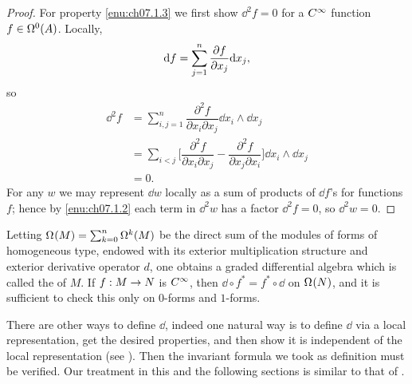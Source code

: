 \documentclass[../main]{subfiles}
\begin{document}
\begin{proof}
\par For property \ref{enu:ch07.1.3} we first show $\dd^2 f = 0$ for a $\CInfty$ function $f \in \formbundle{A}{0}$. Locally, \[\dd f = \sum_{j = 1}^n \pdv{f}{x_j} \dd x_j,\]so 
\begin{align*}
    \dd^2 f &= \sum_{i, j = 1}^n \dfrac{\partial^2 f}{\partial x_i \partial x_j} \dd x_i \wedge \dd x_j \\&= \sum_{i < j} \bigg[\dfrac{\partial^2 f}{\partial x_i \partial x_j} - \dfrac{\partial^2 f}{\partial x_j \partial x_i}\bigg] \dd x_i \wedge \dd x_j\\ &= 0.
\end{align*}
For any $w$ we may represent $\dd w$ locally as a sum of products of $\dd f$'s for functions $f$; hence by \ref{enu:ch07.1.2} each term in $\dd^2 w$ has a factor $\dd^2 f = 0$, so $\dd^2 w = 0$.
\end{proof}



Letting $\formbundle{M}{} = \sum_{k = 0}^n \formbundle{M}{k}$ be the direct sum of the modules of forms of homogeneous type, endowed with its exterior multiplication structure and exterior derivative operator $d$, one obtains a graded differential algebra which is called the  of $M$. If $f : M \functionMaps N$ is $\CInfty$, then $\dd \circ f^\ast = f^\ast \circ \dd$ on $\formbundle{N}{}$, and it is sufficient to check this only on $0$-forms and $1$-forms.

There are other ways to define $\dd$, indeed one natural way is to define $\dd$ via a local representation, get the desired properties, and then show it is independent of the local representation (see \cite[p.~146]{chevalley1946theory}). Then the invariant formula we took as definition must be verified. Our treatment in this and the following sections is similar to that of \cite{palais1954a}.
\end{document}
